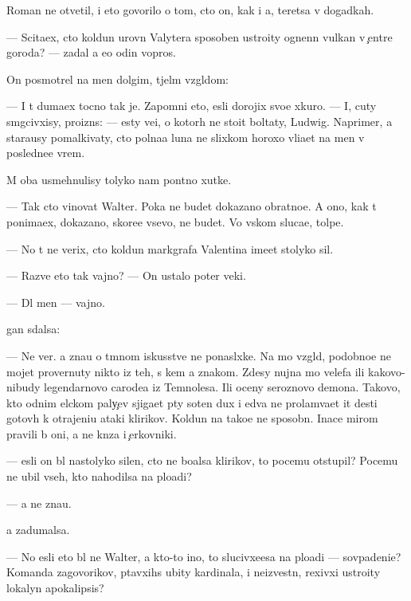 \documentclass[10pt]{book}
\begin{document}
Roman ne otvetil, i eto govorilo o tom, cto on, kak i {\y}a, ter{\ia}{\y}etsa v dogadkah.

— Scita{\y}ex, cto koldun urovn{\ia} Valytera sposoben ustro{\y}ity ognenn{\yi}{\y} vulkan v {\c}entre goroda? — zadal {\y}a {\y}e{\x}o odin vopros.

On posmotrel na men{\ia} dolgim, t{\ia}jel{\yi}m vzgl{\ia}dom:

— I t{\yi} duma{\y}ex tocno tak je. Zapomni eto, {\y}esli dorojix svo{\y}e{\y} xkuro{\y}. — I, cuty sm{\ia}gcivxisy, proizn{\e}s: — {\Y}esty ve{\x}i, o kotor{\yi}h ne sto{\y}it boltaty, Ludwig. Naprimer, {\y}a stara{\y}usy pomalkivaty, cto polna{\y}a luna ne slixkom horoxo vli{\y}a{\y}et na men{\ia} v posledne{\y}e vrem{\ia}.

M{\yi} oba usmehnulisy tolyko nam pon{\ia}tno{\y} xutke.

— Tak cto vinovat Walter. Poka ne budet dokazano obratno{\y}e. A ono, kak t{\yi} ponima{\y}ex, dokazano, skore{\y}e vsevo, ne budet. Vo vs{\ia}kom sluca{\y}e, tolpe.

— No t{\yi} ne verix, cto koldun markgrafa Valentina ime{\y}et stolyko sil.

— Razve eto tak vajno? — On ustalo poter veki.

— Dl{\ia} men{\ia} — vajno.

{\C}{\yi}gan sdalsa:

— Ne ver{\iu}. {\Y}a zna{\y}u o t{\e}mnom iskusstve ne ponasl{\yi}xke. Na mo{\y} vzgl{\ia}d, podobno{\y}e ne mojet provernuty nikto iz teh, s kem {\y}a znakom. Zdesy nujna mo{\x} velefa ili kakovo-nibudy legendarnovo carode{\y}a iz Temnoles{\y}a. Ili oceny ser{\y}oznovo demona. Takovo, kto odnim {\x}elckom paly{\c}ev sjiga{\y}et p{\ia}ty soten dux i {\y}edva ne prolam{\yi}va{\y}et {\x}it des{\ia}ti gotov{\yi}h k otrajeni{\y}u ataki klirikov. Koldun{\yi} na tako{\y}e ne sposobn{\yi}. Inace mirom pravili b{\yi} oni, a ne kn{\ia}z{\y}a i {\c}erkovniki.

— {\Y}esli on b{\yi}l nastolyko silen, cto ne bo{\y}alsa klirikov, to pocemu otstupil? Pocemu ne ubil vseh, kto nahodilsa na plo{\x}adi?

— {\Y}a ne zna{\y}u.

{\Y}a zadumalsa.

— No {\y}esli eto b{\yi}l ne Walter, a kto-to ino{\y}, to slucivxe{\y}esa na plo{\x}adi — sovpadeni{\y}e? Komanda zagovor{\x}ikov, p{\yi}tavxihs{\ia} ubity kardinala, i ne{\y}izvestn{\yi}{\y}, rexivxi{\y} ustro{\y}ity lokalyn{\yi}{\y} apokalipsis?
\end{document}

